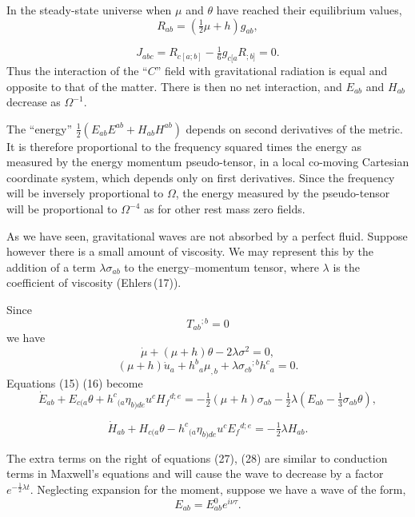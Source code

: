 In the steady-state universe when $\mu$ and $\theta$ have reached their 
equilibrium values,
\[
R_{ab} = \left(\tfrac{1}{2}\mu + h\right) g_{ab},
\]

\[
J_{abc} = R_{c[a;b]} - \tfrac{1}{6} g_{c[a}R_{;b]} = 0.
\]
Thus the interaction of the ``$C$'' field with gravitational radiation is 
equal and opposite to that of the matter. There is then no net 
interaction, and $E_{ab}$ and $H_{ab}$ decrease as $\Omega^{-1}$.

The ``energy'' $\tfrac{1}{2}(E_{ab}E^{ab} + H_{ab}H^{ab})$ depends on second derivatives 
of the metric. It is therefore proportional to the frequency squared 
times the energy as measured by the energy momentum pseudo-tensor, in 
a local co-moving Cartesian coordinate system, which depends only on 
first derivatives. Since the frequency will be inversely proportional 
to $\Omega$, the energy measured by the pseudo-tensor will be proportional 
to $\Omega^{-4}$ as for other rest mass zero fields.


As we have seen, gravitational waves are not absorbed by a 
perfect fluid. Suppose however there is a small amount of viscosity.  
We may represent this by the addition of a term $\lambda\sigma_{ab}$ to the 
energy–momentum tensor, where $\lambda$ is the coefficient of viscosity 
(Ehlers\,(17)).

Since
\[
T_{ab}{}^{;b} = 0
\]
we have
\[
\dot{\mu} + (\mu+h)\theta - 2\lambda\sigma^{2} = 0, \tag{25}
\]
\[
(\mu+h)\dot{u}_{a} + h^{b}{}_{a}\mu_{,b} + \lambda\sigma_{cb}{}^{;b}h^{c}{}_{a} = 0. \tag{26}
\]
Equations (15) (16) become
\[
\dot{E}_{ab} + E_{c(a}\theta + h^{c}{}_{(a}\eta_{b)de}u^{c} H_{f}{}^{d;e}
= -\tfrac{1}{2}(\mu + h)\sigma_{ab}
- \tfrac{1}{2}\lambda\left(E_{ab} - \tfrac{1}{3}\sigma_{ab}\theta\right), \tag{27}
\]

\[
\dot{H}_{ab} + H_{c(a}\theta - h^{c}{}_{(a}\eta_{b)de}u^{c} E_{f}{}^{d;e}
= -\tfrac{1}{2}\lambda H_{ab}. \tag{28}
\]

The extra terms on the right of equations (27), (28) are similar to 
conduction terms in Maxwell’s equations and will cause the wave to 
decrease by a factor $e^{-\tfrac{1}{2}\lambda t}$. Neglecting expansion for the moment, 
suppose we have a wave of the form,
\[
E_{ab} = E^{0}_{ab} e^{i\nu\tau}.
\]

